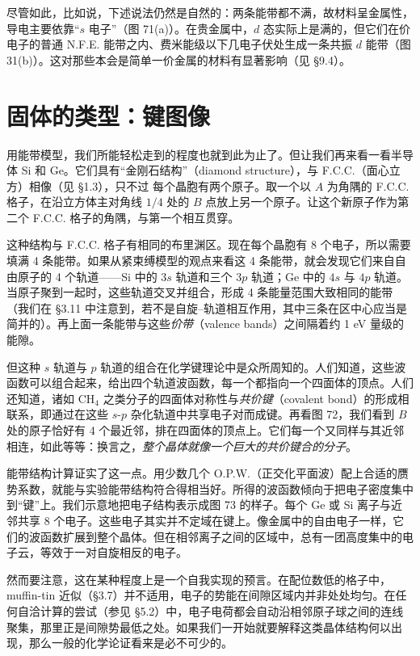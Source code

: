 尽管如此，比如说，下述说法仍然是自然的：两条能带都不满，故材料呈金属性，导电主要依靠“$s$ 电子”（图 71(a)）。在贵金属中，$d$ 态实际上是满的，但它们在价电子的普通 N.F.E. 能带之内、费米能级以下几电子伏处生成一条共振 $d$ 能带（图 31(b)）。这对那些本会是简单一价金属的材料有显著影响（见 §9.4）。

\section{固体的类型：键图像}

用能带模型，我们所能轻松走到的程度也就到此为止了。但让我们再来看一看半导体 Si 和 Ge。它们具有“金刚石结构”（diamond structure），与 F.C.C.（面心立方）相像（见 §1.3），只不过
每个晶胞有两个原子。取一个以 $A$ 为角隅的 F.C.C. 格子，在沿立方体主对角线 $1/4$ 处的 $B$ 点放上另一个原子。让这个新原子作为第二个 F.C.C. 格子的角隅，与第一个相互贯穿。

这种结构与 F.C.C. 格子有相同的布里渊区。现在每个晶胞有 8 个电子，所以需要填满 4 条能带。如果从紧束缚模型的观点来看这 4 条能带，就会发现它们来自自由原子的 4 个轨道——Si 中的 $3s$ 轨道和三个 $3p$ 轨道；Ge 中的 $4s$ 与 $4p$ 轨道。当原子聚到一起时，这些轨道交叉并组合，形成 4 条能量范围大致相同的能带（我们在 §3.11 中注意到，若不是自旋–轨道相互作用，其中三条在区中心应当是简并的）。再上面一条能带与这些\emph{价带}（valence bands）之间隔着约 1 eV 量级的能隙。

但这种 $s$ 轨道与 $p$ 轨道的组合在化学键理论中是众所周知的。人们知道，这些波函数可以组合起来，给出四个轨道波函数，每一个都指向一个四面体的顶点。人们还知道，诸如 CH$_4$ 之类分子的四面体对称性与\emph{共价键}（covalent bond）的形成相联系，即通过在这些 $s$-$p$ 杂化轨道中共享电子对而成键。再看图 72，我们看到 $B$ 处的原子恰好有 4 个最近邻，排在四面体的顶点上。它们每一个又同样与其近邻相连，如此等等：换言之，\emph{整个晶体就像一个巨大的共价键合的分子}。

能带结构计算证实了这一点。用少数几个 O.P.W.（正交化平面波）配上合适的赝势系数，就能与实验能带结构符合得相当好。所得的波函数倾向于把电子密度集中到“键”上。我们示意地把电子结构表示成图 73 的样子。每个 Ge 或 Si 离子与近邻共享 8 个电子。这些电子其实并不定域在键上。像金属中的自由电子一样，它们的波函数扩展到整个晶体。但在相邻离子之间的区域中，总有一团高度集中的电子云，等效于一对自旋相反的电子。


然而要注意，这在某种程度上是一个自我实现的预言。在配位数低的格子中，muffin-tin 近似（§3.7）并不适用，电子的势能在间隙区域内并非处处均匀。在任何自洽计算的尝试（参见 §5.2）中，电子电荷都会自动沿相邻原子球之间的连线聚集，那里正是间隙势最低之处。如果我们一开始就要解释这类晶体结构何以出现，那么一般的化学论证看来是必不可少的。

